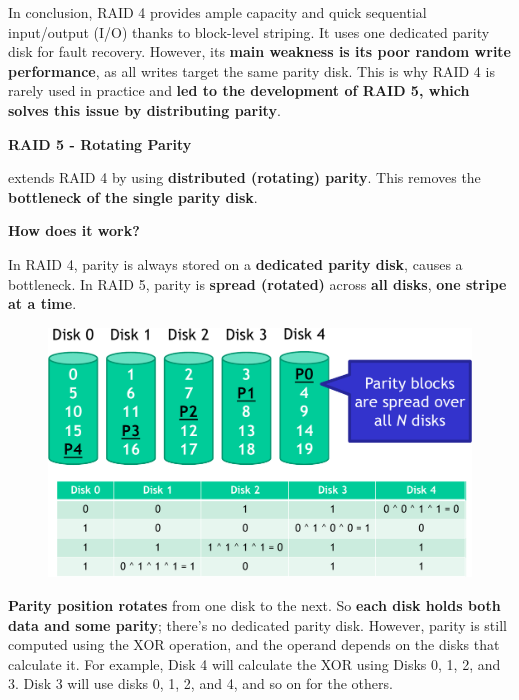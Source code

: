 \highspace
In conclusion, RAID 4 provides ample capacity and quick sequential input/output (I/O) thanks to block-level striping. It uses one dedicated parity disk for fault recovery. However, its \textbf{main weakness is its poor random write performance}, as all writes target the same parity disk. This is why RAID 4 is rarely used in practice and \textbf{led to the development of RAID 5, which solves this issue by distributing parity}.

\newpage

\begin{center}\label{RAID 5}
    \large
    \hypertarget{RAID 5}{\textcolor{Red2}{\textbf{RAID 5 - Rotating Parity}}}
\end{center}

\noindent
{} extends RAID 4 by using \textbf{distributed (rotating) parity}. This removes the \textbf{bottleneck of the single parity disk}.

\highspace
\begin{flushleft}
    \textcolor{Green3}{ \textbf{How does it work?}}
\end{flushleft}
In RAID 4, parity is always stored on a \textbf{dedicated parity disk}, causes a bottleneck. In RAID 5, parity is \textbf{spread (rotated)} across \textbf{all disks}, \textbf{one stripe at a time}.

\begin{figure}[!htp]
    \centering
    \includegraphics[width=\textwidth]{img/raid-9.pdf}
\end{figure}

\noindent
\textbf{Parity position rotates} from one disk to the next. So \textbf{each disk holds both data and some parity}; there's no dedicated parity disk. However, parity is still computed using the XOR operation, and the operand depends on the disks that calculate it. For example, Disk 4 will calculate the XOR using Disks 0, 1, 2, and 3. Disk 3 will use disks 0, 1, 2, and 4, and so on for the others.

